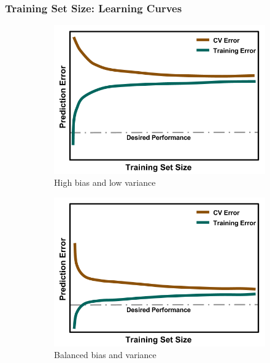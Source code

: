 
\begin{frame}
  \frametitle{Training Set Size: Learning Curves}
  \centering
  \begin{figure}[h!]
    \centering
    \begin{subfigure}{0.33\textwidth}
      \raggedleft
      \includegraphics[width=\linewidth]{./figures/LearningCurve-bias.png}
      \caption{High bias and low variance}
    \end{subfigure}%
    \begin{subfigure}{0.33\textwidth}
      \raggedleft
      \includegraphics[width=\linewidth]{./figures/LearningCurve-ideal.png}
      \caption{Balanced bias and variance}
    \end{subfigure}%
    \begin{subfigure}{0.33\textwidth}
      \raggedleft

\end{subfigure}
\end{figure}
\end{frame}
